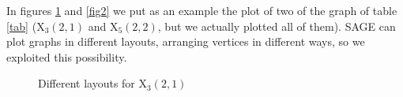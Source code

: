 In figures \ref{fig1} and \ref{fig2} we put as an example the  plot of two of the graph of table \ref{tab} (${\text{X}}_3(2,1)$ and ${\text{X}}_5(2,2)$, but we actually plotted all of them). SAGE can plot graphs in different layouts, arranging vertices in different ways, so we exploited this possibility.

\begin{figure}[!htbp]
\centering
\hspace*{-1.5cm}
\caption{Different layouts for ${\text{X}}_3(2,1)$}
\label{fig1}
\end{figure}
